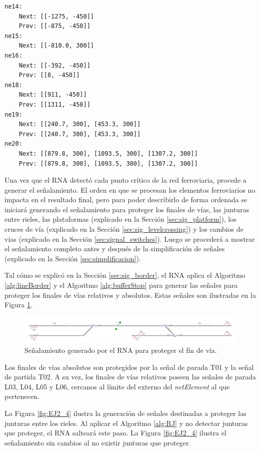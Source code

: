 	\begin{lstlisting}[language = {}, caption = SafePoints.RNA, label = {lst:EJ2_5}]
ne14:
	Next: [[-1275, -450]]
	Prev: [[-875, -450]]
ne15:
	Next: [[-810.0, 300]]
ne16:
	Next: [[-392, -450]]
	Prev: [[8, -450]]
ne18:
	Next: [[911, -450]]
	Prev: [[1311, -450]]
ne19:
	Next: [[240.7, 300], [453.3, 300]]
	Prev: [[240.7, 300], [453.3, 300]]
ne20:
	Next: [[879.8, 300], [1093.5, 300], [1307.2, 300]]
	Prev: [[879.8, 300], [1093.5, 300], [1307.2, 300]]
	\end{lstlisting}	
	
	Una vez que el RNA detectó cada punto crítico de la red ferroviaria, procede a generar el señalamiento. El orden en que se procesan los elementos ferroviarios no impacta en el resultado final, pero para poder describirlo de forma ordenada se iniciará generando el señalamiento para proteger los finales de vías, las junturas entre rieles, las plataformas (explicado en la Sección \ref{sec:sig_platform}), los cruces de vía (explicado en la Sección \ref{sec:sig_levelcrossing}) y los cambios de vías (explicado en la Sección \ref{sec:signal_switches}). Luego se procederá a mostrar el señalamiento completo antes y después de la simplificación de señales (explicado en la Sección \ref{sec:simplificacion}). 
	
	Tal cómo se explicó en la Sección \ref{sec:sig_border}, el RNA aplica el Algoritmo \ref{alg:lineBorder} y el Algoritmo \ref{alg:bufferStop} para generar las señales para proteger los finales de vías relativos y absolutos. Estas señales son ilustradas en la Figura \ref{fig:EJ2_3}.

	\begin{figure}[H]
		\centering
		\includegraphics[width=1\textwidth]{resultados-obtenidos/ejemplo2/images/2_step1.png}
		\centering\caption{Señalamiento generado por el RNA para proteger el fín de vía.}
		\label{fig:EJ2_3}
	\end{figure}

	Los finales de vías absolutos son protegidos por la señal de parada T01 y la señal de partida T02. A su vez, los finales de vías relativos poseen las señales de parada L03, L04, L05 y L06, cercanos al límite del externo del \textit{netElement} al que pertenecen.
	
	La Figura \ref{fig:EJ2_4} ilustra la generación de señales destinadas a proteger las junturas entre los rieles. Al aplicar el Algoritmo \ref{alg:RJ} y no detectar junturas que proteger, el RNA salteará este paso. La Figura \ref{fig:EJ2_4} ilustra el señalamiento sin cambios al no existir junturas que proteger.
	
